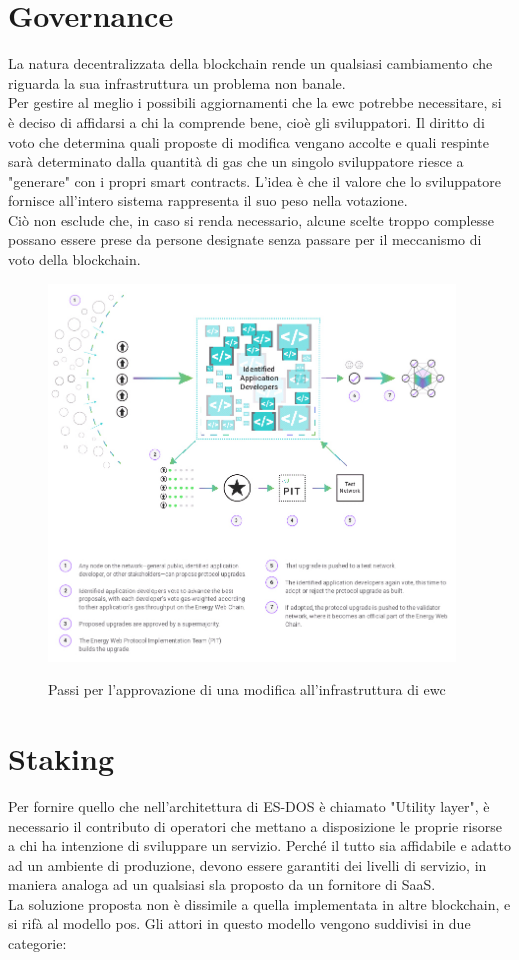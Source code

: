 \documentclass[12pt, letterpaper, twoside]{article}
\begin{document}
\newpage

\section{Governance}
La natura decentralizzata della blockchain rende un qualsiasi cambiamento che riguarda la sua infrastruttura un problema non banale. \\
Per gestire al meglio i possibili aggiornamenti che la \gls{ewc} potrebbe necessitare, si è deciso di affidarsi a chi la comprende bene, cioè gli sviluppatori.
Il diritto di voto che determina quali proposte di modifica vengano accolte e quali respinte sarà determinato dalla quantità di gas che un singolo sviluppatore riesce a "generare" con i propri smart contracts.
L'idea è che il valore che lo sviluppatore fornisce all'intero sistema rappresenta il suo peso nella votazione. \cite{wiki:ew-governance} \\
Ciò non esclude che, in caso si renda necessario, alcune scelte troppo complesse possano essere prese da persone designate senza passare per il meccanismo di voto della blockchain.

\begin{figure}[!h]
    \includegraphics[height=10cm,keepaspectratio]{ew-governance.jpg}
    \centering
    \label{ew-governance}
    \caption{Passi per l'approvazione di una modifica all'infrastruttura di \gls{ewc} \cite{img:ew-governance}}
\end{figure}

\newpage

\section{Staking}
Per fornire quello che nell'architettura di ES-DOS è chiamato "Utility layer", è necessario il contributo di operatori che mettano a disposizione le proprie risorse a chi ha intenzione di sviluppare un servizio.
Perché il tutto sia affidabile e adatto ad un ambiente di produzione, devono essere garantiti dei livelli di servizio, in maniera analoga ad un qualsiasi \gls{sla} proposto da un fornitore di SaaS. \\
La soluzione proposta non è dissimile a quella implementata in altre blockchain, e si rifà al modello \gls{pos}.
Gli attori in questo modello vengono suddivisi in due categorie:
\end{document}
